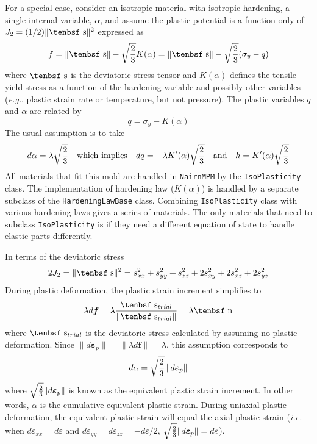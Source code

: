 \documentclass[11pt]{book}
\renewcommand{\vec}[1]{\boldsymbol{#1}}
\def\dev{\hbox{\tenbsf s}}
\def\ndev{\hbox{\tenbsf n}}
\def\dpl{d \vec{\varepsilon}_{p}}
\def\df{d \vec{f}}
\begin{document}
For a special case, consider an isotropic material with isotropic hardening, a single internal variable, $\alpha$, and assume the plastic potential is a function only of $J_2= (1/2)\|\dev\|^2$ expressed as
\begin{equation}
      f = \|\dev\| - \sqrt{2\over3} K(\alpha) = \|\dev\| - \sqrt{2\over3}(\sigma_y - q)
\end{equation}
where $\dev$ is the deviatoric stress tensor and $K(\alpha)$ defines the tensile yield stress as a function of the hardening variable and possibly other variables ({\it e.g.}, plastic strain rate or temperature, but not pressure). The plastic variables $q$ and $\alpha$ are related by
\begin{equation}
      q  = \sigma_y - K(\alpha)
\end{equation}
The usual assumption is to take
\begin{equation}
        d\alpha = \lambda\sqrt{2\over3}  \quad{\rm which\ implies} 
        \quad dq = -\lambda K'(\alpha)\sqrt{2\over3}  \quad{\rm and} 
        \quad h = K'(\alpha)\sqrt{2\over3}
\end{equation}
All materials that fit this mold are handled in {\tt NairnMPM} by the {\tt IsoPlasticity} class. The implementation of hardening law ($K(\alpha)$) is handled by a separate subclass of the {\tt HardeningLawBase} class. Combining {\tt IsoPlasticity} class with various hardening laws gives a series of materials. The only materials that need to subclass {\tt IsoPlasticity} is if they need a different equation of state to handle elastic parts differently.

In terms of the deviatoric stress
\begin{equation}
     2J_2 = \|\dev\|^2 =  s_{xx}^2 + s_{yy}^2  + s_{zz}^2 + 2s_{xy}^2 + 2s_{xz}^2 + 2s_{yz}^2 \\
 \end{equation}
During plastic deformation, 
the plastic strain increment simplifies to
\begin{equation}
     \lambda \df = \lambda {\dev_{trial}\over \|\dev_{trial}\|} = \lambda \ndev
\end{equation}
where $ \dev_{trial}$ is the deviatoric stress calculated by assuming no plastic deformation.
Since $\|\dpl\| = \|\lambda \df\| = \lambda$, this assumption corresponds to
\begin{equation}
     d\alpha = \sqrt{2\over3}\thinspace \|\dpl\|
\end{equation}
where $\sqrt{2\over3}\|\dpl\|$ is known as the equivalent plastic strain increment. In other words, $\alpha$ is the cumulative equivalent plastic strain. During uniaxial plastic deformation, the equivalent plastic strain will equal the axial plastic strain ({\em i.e.} when $d\varepsilon_{xx}=d\varepsilon$ and $d\varepsilon_{yy}=d\varepsilon_{zz} = -d\varepsilon/2$, $\sqrt{2\over3}\|\dpl\| = d\varepsilon$).
\end{document}
